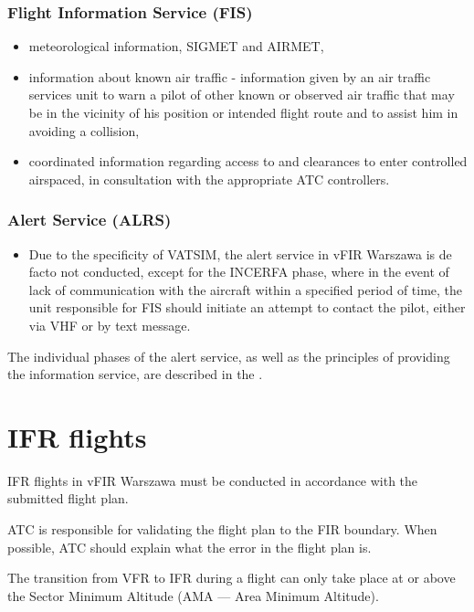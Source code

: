 \subsubsection{Flight Information Service (FIS)}
\begin{itemize}
    \item meteorological information, SIGMET and AIRMET,
    \item information about known air traffic - information given by an air traffic services unit to warn a pilot of other known or observed air traffic that may be in the vicinity of his position or intended flight route and to assist him in avoiding a collision,
    \item coordinated information regarding access to and clearances to enter controlled airspaced, in consultation with the appropriate ATC controllers.
\end{itemize}

\subsubsection{Alert Service (ALRS)}
\begin{itemize}
    \item Due to the specificity of VATSIM, the alert service in vFIR Warszawa is de facto not conducted, except for the INCERFA phase, where in the event of lack of communication with the aircraft within a specified period of time, the unit responsible for FIS should initiate an attempt to contact the pilot, either via VHF or by text message.
\end{itemize}

The individual phases of the alert service, as well as the principles of providing the information service, are described in the .

\section{IFR flights}%

IFR flights in vFIR Warszawa must be conducted in accordance with the submitted flight plan.

ATC is responsible for validating the flight plan to the FIR boundary. When possible, ATC should explain what the error in the flight plan is.

The transition from VFR to IFR during a flight can only take place at or above the Sector Minimum Altitude (AMA --- Area Minimum Altitude).

